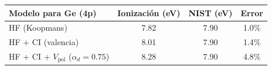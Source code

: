 \begin{tabular}{lccc}
    \toprule
    \textbf{Modelo para Ge (4p)} & \textbf{Ionización (eV)} & \textbf{NIST (eV)} & \textbf{Error} \\
    \midrule
    HF (Koopmans) & 7.82 & 7.90 & 1.0\% \\
    HF + CI (valencia) & 8.01 & 7.90 & 1.4\% \\
    HF + CI + $V_{\text{pol}}$ ($\alpha_d = 0.75$) & 8.28 & 7.90 & 4.8\% \\
    \bottomrule
\end{tabular}

